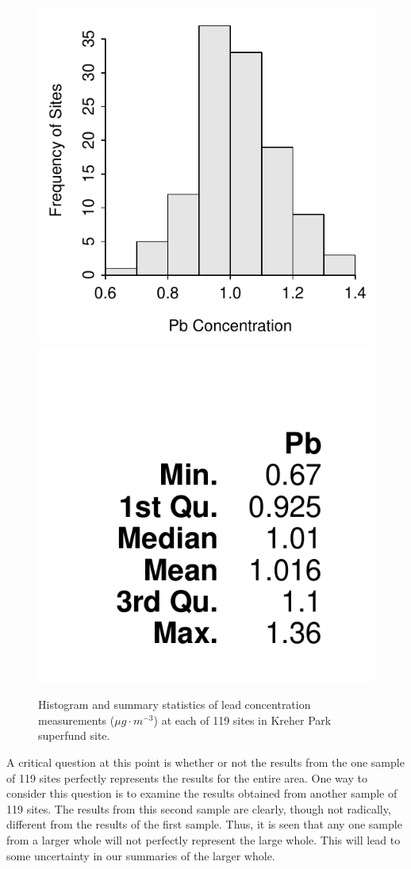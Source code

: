 \documentclass[10pt,openany]{book}\usepackage[]{graphicx}\usepackage[]{color}
\newenvironment{knitrout}{}{} %
\begin{document}
\begin{knitrout}
\color{fgcolor}\begin{figure}[hbtp]

{\centering \includegraphics[width=.4\linewidth]{Figs/KreherParkPbhist-1} 
\includegraphics[width=.4\linewidth]{Figs/KreherParkPbhist-2} 

}

\caption[Histogram and summary statistics of lead concentration measurements ($\mu g \cdot m^{-3}$) at each of 119 sites in Kreher Park superfund site]{Histogram and summary statistics of lead concentration measurements ($\mu g \cdot m^{-3}$) at each of 119 sites in Kreher Park superfund site.}\label{fig:KreherParkPbhist}
\end{figure}


\end{knitrout}

A critical question at this point is whether or not the results from the one sample of 119 sites perfectly represents the results for the entire area. One way to consider this question is to examine the results obtained from another sample of 119 sites. The results from this second sample  are clearly, though not radically, different from the results of the first sample. Thus, it is seen that any one sample from a larger whole will not perfectly represent the large whole. This will lead to some uncertainty in our summaries of the larger whole.
\end{document}
